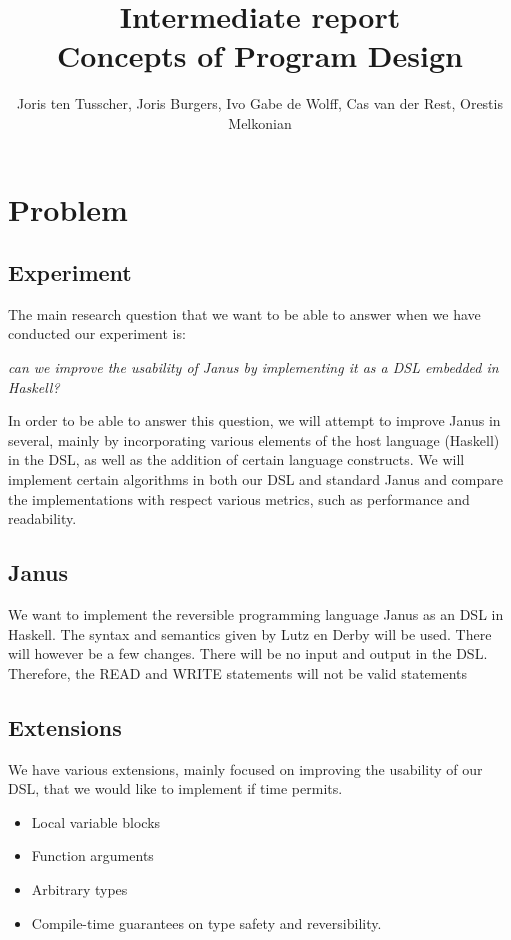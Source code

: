 \documentclass[12pt,a4paper]{article}
\title{\textbf{Intermediate report \\ \small{Concepts of Program Design}}}
\author{\small{Joris ten Tusscher, Joris Burgers, Ivo Gabe de Wolff, Cas van der Rest, Orestis Melkonian}}
\date{}
\begin{document}
\maketitle


\section{Problem}
    \subsection{Experiment}
    The main research question that we want to be able to answer when we have conducted our experiment is:
    
    \begin{displayquote}
    \textit{can we improve the usability of Janus by implementing it as a DSL embedded in Haskell?}
    \end{displayquote}
    
    \noindent In order to be able to answer this question, we will attempt to improve Janus in several, mainly by incorporating various elements of the host language (Haskell) in the DSL, as well as the addition of certain language constructs. 
    We will implement certain algorithms in both our DSL and standard Janus and compare the implementations with respect various metrics, such as performance and readability. 
    
    \subsection{Janus}
    We want to implement the reversible programming language Janus as an DSL in Haskell. The syntax and semantics given by Lutz en Derby \cite{lutz82} will be used. There will however be a few changes. There will be no input and output in the DSL. Therefore, the READ and WRITE statements will not be valid statements
    
    \subsection{Extensions}
    We have various extensions, mainly focused on improving the usability of our DSL, that we would like to implement if time permits.
    
\begin{itemize}
\item 
Local variable blocks
\item
Function arguments
\item
Arbitrary types
\item
Compile-time guarantees on type safety and reversibility. 
\end{itemize}
    
\end{document}
